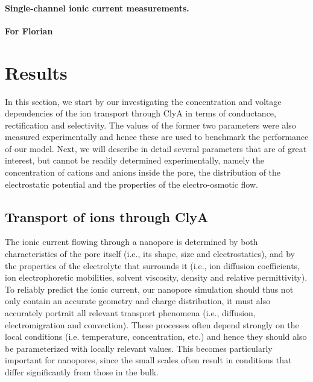 \documentclass[journal=ancac3, manuscript=article, etalmode=truncate,maxauthors=0]{achemso}
\begin{document}
\paragraph{Single-channel ionic current measurements.}
\textbf{For Florian}

\newpage
\section{Results}\label{sect:results}
In this section, we start by our investigating the concentration and voltage dependencies of the ion 
transport through ClyA in terms of conductance, rectification and selectivity. The values of the former two 
parameters were also measured experimentally and hence these are used to benchmark the performance of our 
model. Next, we will describe in detail several parameters that are of great interest, but cannot be readily 
determined experimentally, namely the concentration of cations and anions inside the pore, the distribution 
of the electrostatic potential and the properties of the electro-osmotic flow. 

\subsection{Transport of ions through ClyA}
The ionic current flowing through a nanopore is determined by both characteristics of the pore itself (i.e., 
its shape, size and electrostatics), and by the properties of the electrolyte that surrounds it (i.e., 
ion diffusion coefficients, ion electrophoretic mobilities, solvent viscosity, density and relative 
permittivity). To reliably predict the ionic current, our nanopore simulation should thus not only contain an 
accurate geometry and charge distribution, it must also accurately portrait all relevant transport phenomena 
(i.e., diffusion, electromigration and convection). These processes often depend strongly on the local 
conditions (i.e. temperature, concentration, etc.) and hence they should also be parameterized with locally 
relevant values. This becomes particularly important for nanopores, since the small scales often result in 
conditions that differ significantly from those in the bulk.
\end{document}
